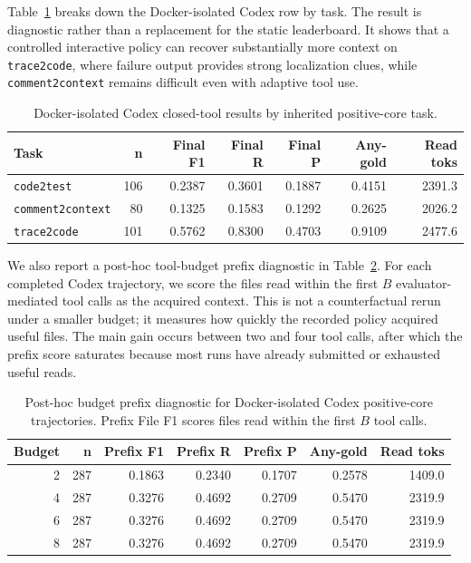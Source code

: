 \documentclass[11pt]{article}
\newcommand{\code}[1]{\texttt{#1}}
\begin{document}
Table~\ref{tab:closed-tool-task} breaks down the Docker-isolated Codex row by task. The result is diagnostic rather than a replacement for the static leaderboard. It shows that a controlled interactive policy can recover substantially more context on \code{trace2code}, where failure output provides strong localization clues, while \code{comment2context} remains difficult even with adaptive tool use.

\begin{table}[h]
\centering
\caption{Docker-isolated Codex closed-tool results by inherited positive-core task.}
\label{tab:closed-tool-task}
\small
\begin{tabular}{lrrrrrr}
\toprule
Task & n & Final F1 & Final R & Final P & Any-gold & Read toks \\
\midrule
\code{code2test} & 106 & 0.2387 & 0.3601 & 0.1887 & 0.4151 & 2391.3 \\
\code{comment2context} & 80 & 0.1325 & 0.1583 & 0.1292 & 0.2625 & 2026.2 \\
\code{trace2code} & 101 & 0.5762 & 0.8300 & 0.4703 & 0.9109 & 2477.6 \\
\bottomrule
\end{tabular}
\end{table}

We also report a post-hoc tool-budget prefix diagnostic in Table~\ref{tab:closed-tool-budget}. For each completed Codex trajectory, we score the files read within the first \(B\) evaluator-mediated tool calls as the acquired context. This is not a counterfactual rerun under a smaller budget; it measures how quickly the recorded policy acquired useful files. The main gain occurs between two and four tool calls, after which the prefix score saturates because most runs have already submitted or exhausted useful reads.

\begin{table}[h]
\centering
\caption{Post-hoc budget prefix diagnostic for Docker-isolated Codex positive-core trajectories. Prefix File F1 scores files read within the first \(B\) tool calls.}
\label{tab:closed-tool-budget}
\small
\begin{tabular}{rrrrrrr}
\toprule
Budget & n & Prefix F1 & Prefix R & Prefix P & Any-gold & Read toks \\
\midrule
2 & 287 & 0.1863 & 0.2340 & 0.1707 & 0.2578 & 1409.0 \\
4 & 287 & 0.3276 & 0.4692 & 0.2709 & 0.5470 & 2319.9 \\
6 & 287 & 0.3276 & 0.4692 & 0.2709 & 0.5470 & 2319.9 \\
8 & 287 & 0.3276 & 0.4692 & 0.2709 & 0.5470 & 2319.9 \\
\bottomrule
\end{tabular}
\end{table}
\end{document}
